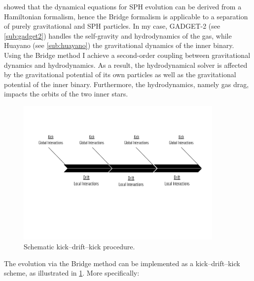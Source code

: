 \cite{saitoh2010fast} showed that the dynamical equations for SPH evolution can be derived from a Hamiltonian formalism, hence the Bridge formalism is applicable to a separation of purely gravitational and SPH particles. In my case, GADGET-2 (see \cref{sub:gadget2}) handles the self-gravity and hydrodynamics of the gas, while Huayano (see \cref{sub:huayano}) the gravitational dynamics of the inner binary. Using the Bridge method I achieve a second-order coupling between gravitational dynamics and hydrodynamics. As a result, the hydrodynamical solver is affected by the gravitational potential of its own particles as well as the gravitational potential of the inner binary. Furthermore, the hydrodynamics, namely gas drag, impacts the orbits of the two inner stars.
\begin{figure}[H]
    \centering
    \includegraphics[width=0.9\textwidth]{Thesis/figures/kick_drift_kick.pdf}
    \caption{Schematic kick–drift–kick procedure.}
    \label{fig:kick_drift_kick}
\end{figure}
The evolution via the Bridge method can be implemented as a kick–drift–kick scheme, as illustrated in \cref{fig:kick_drift_kick}. More specifically:
